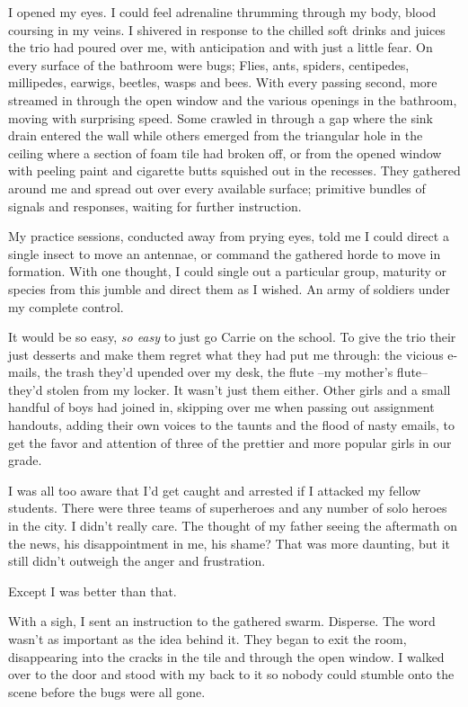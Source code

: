 I opened my eyes. I could feel adrenaline thrumming through my body, blood coursing in my veins. I shivered in response to the chilled soft drinks and juices the trio had poured over me, with anticipation and with just a little fear. On every surface of the bathroom were bugs; Flies, ants, spiders, centipedes, millipedes, earwigs, beetles, wasps and bees. With every passing second, more streamed in through the open window and the various openings in the bathroom, moving with surprising speed. Some crawled in through a gap where the sink drain entered the wall while others emerged from the triangular hole in the ceiling where a section of foam tile had broken off, or from the opened window with peeling paint and cigarette butts squished out in the recesses. They gathered around me and spread out over every available surface; primitive bundles of signals and responses, waiting for further instruction.

My practice sessions, conducted away from prying eyes, told me I could direct a single insect to move an antennae, or command the gathered horde to move in formation. With one thought, I could single out a particular group, maturity or species from this jumble and direct them as I wished. An army of soldiers under my complete control.

It would be so easy, {\em so easy} to just go Carrie on the school. To give the trio their just desserts and make them regret what they had put me through: the vicious e-mails, the trash they'd upended over my desk, the flute --my mother's flute-- they'd stolen from my locker. It wasn't just them either. Other girls and a small handful of boys had joined in,  skipping over me when passing out assignment handouts, adding their own voices to the taunts and the flood of nasty emails, to get the favor and attention of three of the prettier and more popular girls in our grade.

I was all too aware that I'd get caught and arrested if I attacked my fellow students. There were three teams of superheroes and any number of solo heroes in the city. I didn't really care. The thought of my father seeing the aftermath on the news, his disappointment in me, his shame? That was more daunting, but it still didn't outweigh the anger and frustration.

Except I was better than that.

With a sigh, I sent an instruction to the gathered swarm. Disperse. The word wasn't as important as the idea behind it. They began to exit the room, disappearing into the cracks in the tile and through the open window. I walked over to the door and stood with my back to it so nobody could stumble onto the scene before the bugs were all gone.

